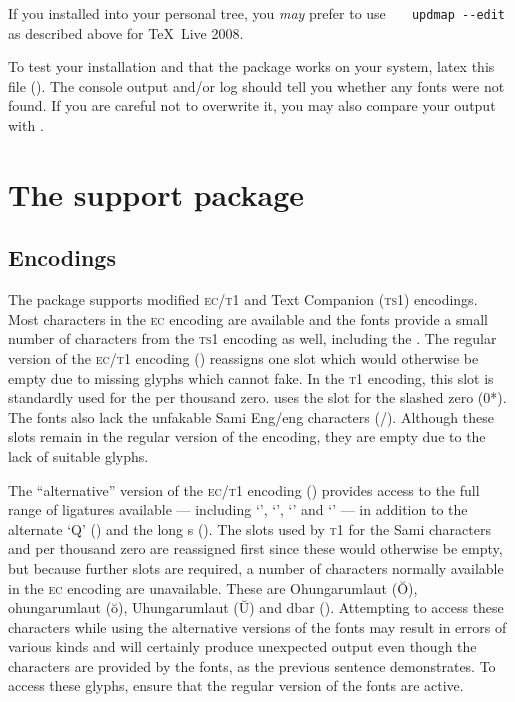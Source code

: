 \documentclass[11pt,british]{article}
\begin{document}
If you installed into your personal tree, you \emph{may} prefer to use \verb|	updmap --edit| as described above for \TeX~Live 2008.

To test your installation and that the package works on your system, latex this file (). The console output and/or log should tell you whether any fonts were not found. If you are careful not to overwrite it, you may also compare your output with .

\section{The support package}\label{sec:support}

\subsection{Encodings}\label{sec:encs}

The package supports modified \textsc{ec}/\textsc{t1} and Text Companion (\textsc{ts1}) encodings. Most characters in the \textsc{ec} encoding are available and the fonts provide a small number of characters from the \textsc{ts1} encoding as well, including the \texteuro. The regular version of the \textsc{ec}/\textsc{t1} encoding () reassigns one slot which would otherwise be empty due to missing glyphs which  cannot fake. In the \textsc{t1} encoding, this slot is standardly used for the per thousand zero.  uses the slot for the slashed zero (0*). The fonts also lack the unfakable Sami Eng/eng characters (\textorigrm{\NG}/\textorigrm{\ng}). Although these slots remain in the regular version of the encoding, they are empty due to the lack of suitable glyphs.

The ``alternative'' version of the \textsc{ec}/\textsc{t1} encoding () provides access to the full range of ligatures available --- including `', `', `' and `' --- in addition to the alternate `Q' () and the long s (). The slots used by \textsc{t1} for the Sami characters and per thousand zero are reassigned first since these would otherwise be empty, but because further slots are required, a number of characters normally available in the \textsc{ec} encoding are unavailable. These are Ohungarumlaut (\u{O}), ohungarumlaut (\u{o}), Uhungarumlaut (\u{U}) and dbar (\dj). Attempting to access these characters while using the alternative versions of the fonts may result in errors of various kinds and will certainly produce unexpected output even though the characters are provided by the fonts, as the previous sentence demonstrates. To access these glyphs, ensure that the regular version of the fonts are active.
\end{document}
